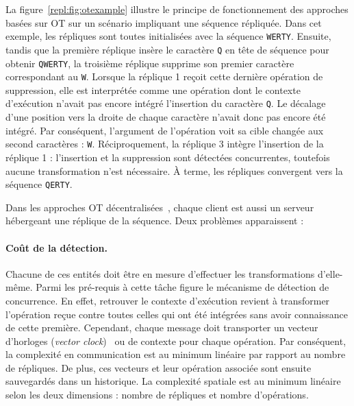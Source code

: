 La figure~\ref{repl:fig:otexample} illustre le principe de fonctionnement des
approches basées sur OT sur un scénario impliquant une séquence répliquée. Dans
cet exemple, les répliques sont toutes initialisées avec la séquence
\texttt{WERTY}. Ensuite, tandis que la première réplique insère le caractère
\texttt{Q} en tête de séquence pour obtenir \texttt{QWERTY}, la troisième
réplique supprime son premier caractère correspondant au \texttt{W}. Lorsque la
réplique 1 reçoit cette dernière opération de suppression, elle est interprétée
comme une opération dont le contexte d'exécution n'avait pas encore intégré
l'insertion du caractère \texttt{Q}. Le décalage d'une position vers la droite
de chaque caractère n'avait donc pas encore été intégré. Par conséquent,
l'argument de l'opération voit sa cible changée aux second caractères :
\texttt{W}.  Réciproquement, la réplique 3 intègre l'insertion de la réplique 1
: l'insertion et la suppression sont détectées concurrentes, toutefois aucune
transformation n'est nécessaire. À terme, les répliques convergent vers la
séquence \texttt{QERTY}. %


Dans les approches OT décentralisées~\cite{sun2009contextbased}, chaque client
est aussi un serveur hébergeant une réplique de la séquence. Deux problèmes
apparaissent : 

\paragraph{Coût de la détection.} Chacune de ces entités doit être en mesure
d'effectuer les transformations d'elle-même. Parmi les pré-requis à cette tâche
figure le mécanisme de détection de concurrence. En effet, retrouver le contexte
d'exécution revient à transformer l'opération reçue contre toutes celles qui ont
été intégrées sans avoir connaissance de cette première. Cependant, chaque
message doit transporter un vecteur d'horloges (\emph{vector
  clock})~\cite{lamport1978time} ou de contexte pour chaque opération. Par
conséquent, la complexité en communication est au minimum linéaire par rapport
au nombre de répliques.  De plus, ces vecteurs et leur opération associée sont
ensuite sauvegardés dans un historique. La complexité spatiale est au minimum
linéaire selon les deux dimensions : nombre de répliques et nombre d'opérations.

